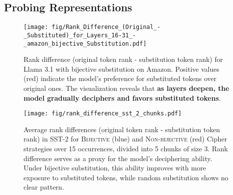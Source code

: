 \documentclass[11pt]{article}
\newcommand{\llama}{Llama 3.1 }
\begin{document}
\subsection{Probing Representations}
\label{sec:probing}

\begin{figure}[h]
\centering
\texttt{[image: fig/Rank\_Difference\_(Original\_-\_Substituted)\_for\_Layers\_16-31\_-\_amazon\_bijective\_Substitution.pdf]}
\caption{Rank difference (original token rank - substitution token rank) for \llama with bijective substitution on Amazon. Positive values (red) indicate the model's preference for substituted tokens over original ones. The visualization reveals that \textbf{as layers deepen, the model gradually deciphers and favors substituted tokens}.}
\label{fig:heatmap}
\end{figure}




\begin{figure}[h]
\centering
\texttt{[image: fig/rank\_difference\_sst\_2\_chunks.pdf]}
\caption{Average rank differences (original token rank - substitution token rank) in SST-2 for \textsc{Bijective} (blue) and \textsc{Non-bijective} (red) Cipher strategies over 15 occurrences, divided into 5 chunks of size 3. Rank difference serves as a proxy for the model's deciphering ability. Under bijective substitution, this ability improves with more exposure to substituted tokens, while random substitution shows no clear pattern.}
\end{figure}\label{fig:chunks}

\end{document}
